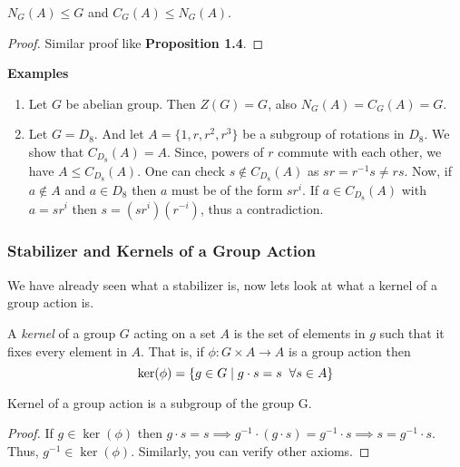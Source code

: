 \begin{proposition}
    $N_G(A) \le G$ and $C_G(A) \le N_G(A)$.
\end{proposition}

\begin{proof}
    Similar proof like \textbf{Proposition 1.4}. 
\end{proof}

\textbf{Examples}

\begin{enumerate}
    \item Let $G$ be abelian group. Then $Z(G)=G$, also $N_G(A)=C_G(A)=G$.
    \item Let $G=D_8$. And let $A=\{1,r,r^2,r^3\}$ be a subgroup of rotations in $D_8$. We show that $C_{D_8}(A)=A$.
          Since, powers of $r$ commute with each other, we have $A \le C_{D_8}(A)$. One can check $s \not \in C_{D_8}(A)$
          as $sr = r^{-1}s \neq rs$. Now, if $a \not \in A$ and $a \in D_8$ then $a$ must be of the form $sr^i$. If $a \in C_{D_8}(A)$
          with $a=sr^i$ then $s=(sr^{i})(r^{-i})$, thus a contradiction.
\end{enumerate}

\subsubsection*{Stabilizer and Kernels of a Group Action}

We have already seen what a stabilizer is, now lets look at what a kernel of a group action is.

\begin{definition}
    A \textit{kernel} of a group $G$ acting on a set $A$ is the set of elements in $g$ such that it fixes every element in $A$. That is,
    if $\phi : G \times A \to A$ is a group action then 
    \[ \ker(\phi) = \{ g \in G \mid g \cdot s = s \hspace{2mm} \forall s \in A \} \]
\end{definition}

\begin{proposition}
    Kernel of a group action is a subgroup of the group G. 
\end{proposition}

\begin{proof}
    If $g \in \ker (\phi)$ then $g \cdot s = s \implies g^{-1} \cdot (g \cdot s )=g^{-1} \cdot s \implies s = g^{-1} \cdot s$.
    Thus, $g^{-1} \in \ker(\phi)$. Similarly, you can verify other axioms.
\end{proof}

